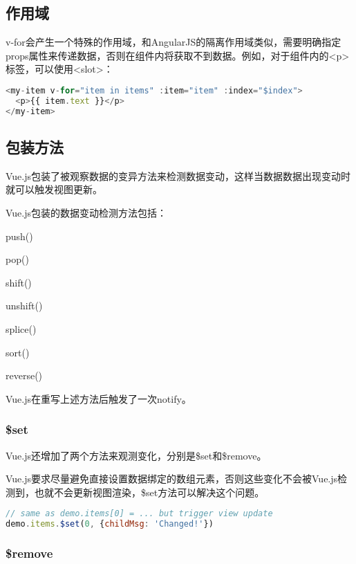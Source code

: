 \subsection{作用域}

v-for会产生一个特殊的作用域，和AngularJS的隔离作用域类似，需要明确指定props属性来传递数据，否则在组件内将获取不到数据。例如，对于组件内的<p>标签，可以使用<slot>：


\begin{lstlisting}[language=JavaScript]
<my-item v-for="item in items" :item="item" :index="$index">
  <p>{{ item.text }}</p>
</my-item>
\end{lstlisting}

\subsection{包装方法}

Vue.js包装了被观察数据的变异方法来检测数据变动，这样当数据数据出现变动时就可以触发视图更新。


Vue.js包装的数据变动检测方法包括：

\begin{compactitem}
\item push()
\item pop()
\item shift()
\item unshift()
\item splice()
\item sort()
\item reverse()
\end{compactitem}


Vue.js在重写上述方法后触发了一次notify。


\subsubsection{\$set}

Vue.js还增加了两个方法来观测变化，分别是\$set和\$remove。

Vue.js要求尽量避免直接设置数据绑定的数组元素，否则这些变化不会被Vue.js检测到，也就不会更新视图渲染，\$set方法可以解决这个问题。




\begin{lstlisting}[language=JavaScript]
// same as demo.items[0] = ... but trigger view update
demo.items.$set(0, {childMsg: 'Changed!'})
\end{lstlisting}


\subsubsection{\$remove}

